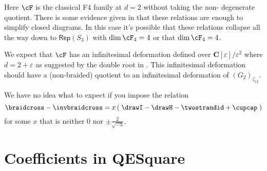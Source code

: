 \documentclass[12pt]{amsart}
\begin{document}
Here $\cF$ is the classical F4 family at $d=2$ without taking the non-
degenerate quotient.  There is some evidence given in \cite{F4E6} that these
relations are enough to simplify closed diagrams.  In this case it's possible
that these relations collapse all the way down to $\mathsf{Rep}(S_3)$ with
$\dim \cF_4 = 4$ or that $\dim \cF_4 = 4$.

\begin{remark}
We expect that $\cF$ has an infinitesimal deformation defined over
$\mathbf{C}[\varepsilon]/\varepsilon^2$ where $d = 2+\varepsilon$ as suggested
by the double root in \cite[p. 3]{F4E6}.  This infinitesimal deformation should have
a (non-braided) quotient to an infinitesimal deformation of
$(G_2)_{\zeta_{12}}$.
\end{remark}

We have no idea what to expect if you impose the relation
$$\braidcross - \invbraidcross = x \left(\;\drawI - \drawH - \twostrandid + \cupcap \; \right)$$ 
for some $x$ that is neither $0$ nor $\pm \frac{2}{\sqrt{-3}}$.




\appendix
\section{Coefficients in QESquare}
\label{app:coefficients}

\nn{}

\renewcommand*{\bibfont}{\small}
\setlength{\bibitemsep}{0pt}
\raggedright
\printbibliography
\end{document}
